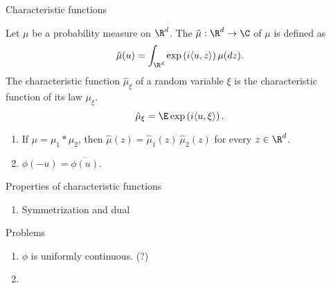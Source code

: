 \begin{frame}
    {Characteristic functions}

    \begin{definition}
        Let $\mu$ be a probability measure on $\R^d$. The 
        $\hat \mu: \R^d \to \C$ of $\mu$ is defined as
        \begin{equation*}
            \hat \mu (u) = \int_{\R^d} \exp\left( i \langle u,z \rangle \right) \mu(dz).
        \end{equation*}
        The characteristic function $\hat\mu_\xi$ of a random variable $\xi$ is
        the characteristic function of its law $\mu_\xi$.
        \begin{equation*}
            \hat \mu_\xi = \E \exp\left( i \langle u, \xi \rangle \right).
        \end{equation*}
    \end{definition}

    \begin{enumerate}
        \item If $\mu = \mu_1 * \mu_2$, then $\hat \mu(z) = \hat \mu_1(z)\ \hat \mu_2(z)$
            for every $z\in\R^d$. 
        \item $\phi(-u)= \overline{\phi(u)}$. 
    \end{enumerate}
\end{frame}


\begin{frame}
    {Properties of characteristic functions}
   
    \begin{enumerate}
        \item Symmetrization and dual
    \end{enumerate}


    \begin{block}{Problems}
        \begin{enumerate}
            \item $\phi$ is uniformly continuous. (?)
            \item 
        \end{enumerate}
    \end{block}


\end{frame}

